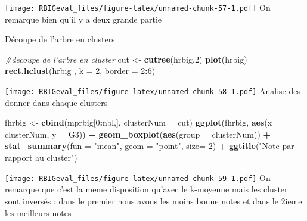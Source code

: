 \documentclass[
]{article}
\newenvironment{Shaded}{\begin{snugshade}}{\end{snugshade}}
\newcommand{\CommentTok}[1]{\textcolor[rgb]{0.56,0.35,0.01}{\textit{#1}}}
\newcommand{\DataTypeTok}[1]{\textcolor[rgb]{0.13,0.29,0.53}{#1}}
\newcommand{\DecValTok}[1]{\textcolor[rgb]{0.00,0.00,0.81}{#1}}
\newcommand{\KeywordTok}[1]{\textcolor[rgb]{0.13,0.29,0.53}{\textbf{#1}}}
\newcommand{\NormalTok}[1]{#1}
\newcommand{\OperatorTok}[1]{\textcolor[rgb]{0.81,0.36,0.00}{\textbf{#1}}}
\newcommand{\StringTok}[1]{\textcolor[rgb]{0.31,0.60,0.02}{#1}}
\begin{document}
\begin{Shaded}
\end{Shaded}

\texttt{[image: RBIGeval\_files/figure-latex/unnamed-chunk-57-1.pdf]} On
remarque bien qu'il y a deux grande partie

Découpe de l'arbre en clusters

\begin{Shaded}
\begin{Highlighting}[]
\CommentTok{#decoupe de l'arbre en cluster}
\NormalTok{cut <-}\StringTok{ }\KeywordTok{cutree}\NormalTok{(hrbig,}\DecValTok{2}\NormalTok{)}
\KeywordTok{plot}\NormalTok{(hrbig)}
\KeywordTok{rect.hclust}\NormalTok{(hrbig , }\DataTypeTok{k =} \DecValTok{2}\NormalTok{, }\DataTypeTok{border =} \DecValTok{2}\OperatorTok{:}\DecValTok{6}\NormalTok{)}
\end{Highlighting}
\end{Shaded}

\texttt{[image: RBIGeval\_files/figure-latex/unnamed-chunk-58-1.pdf]}
Analise des donner dans chaque clusters

\begin{Shaded}
\begin{Highlighting}[]
\NormalTok{fhrbig <-}\StringTok{ }\KeywordTok{cbind}\NormalTok{(mprbig[}\DecValTok{0}\OperatorTok{:}\NormalTok{nbl,], }\DataTypeTok{clusterNum =}\NormalTok{ cut)}
\KeywordTok{ggplot}\NormalTok{(fhrbig, }\KeywordTok{aes}\NormalTok{(}\DataTypeTok{x =}\NormalTok{ clusterNum, }\DataTypeTok{y =}\NormalTok{ G3)) }\OperatorTok{+}\StringTok{ }
\StringTok{  }\KeywordTok{geom_boxplot}\NormalTok{(}\KeywordTok{aes}\NormalTok{(}\DataTypeTok{group =}\NormalTok{ clusterNum)) }\OperatorTok{+}\StringTok{ }
\StringTok{  }\KeywordTok{stat_summary}\NormalTok{(}\DataTypeTok{fun =} \StringTok{"mean"}\NormalTok{, }\DataTypeTok{geom =} \StringTok{"point"}\NormalTok{, }\DataTypeTok{size=} \DecValTok{2}\NormalTok{) }\OperatorTok{+}
\StringTok{  }\KeywordTok{ggtitle}\NormalTok{(}\StringTok{"Note par rapport au cluster"}\NormalTok{)}
\end{Highlighting}
\end{Shaded}

\texttt{[image: RBIGeval\_files/figure-latex/unnamed-chunk-59-1.pdf]} On
remarque que c'est la meme disposition qu'avec le k-moyenne mais les
cluster sont inversés : dans le premier nous avons les moins bonne notes
et dans le 2ieme les meilleurs notes
\end{document}
